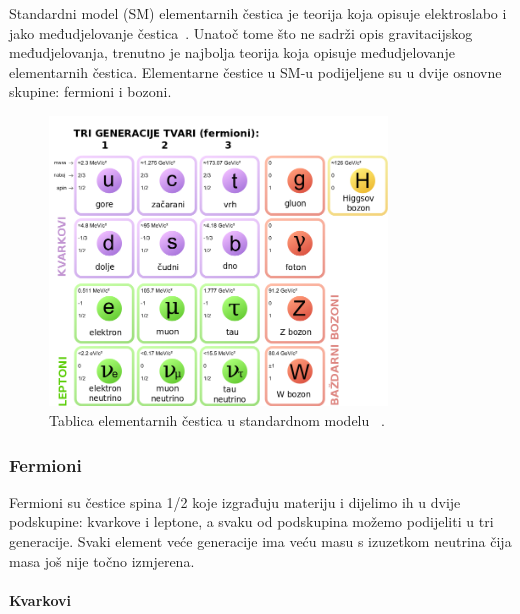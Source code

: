 \documentclass[12pt,a4paper,oneside]{article}
\begin{document}
\begin{linenumbers}
		Standardni model (SM) elementarnih čestica je teorija koja opisuje elektroslabo i jako međudjelovanje čestica~\cite{uvod}. Unatoč tome što ne sadrži opis gravitacijskog međudjelovanja, trenutno je najbolja teorija koja opisuje međudjelovanje elementarnih čestica.
		Elementarne čestice u SM-u podijeljene su u dvije osnovne skupine: fermioni i bozoni.
		\begin{figure}[H]
			\centering
			\includegraphics[width=0.8\textwidth]{Standard_Model_of_Elementary_Particles_hr.png}
			\caption[SM]{\label{sl:primjer}Tablica elementarnih čestica u standardnom modelu ~\cite{standardni_model}.}
		\end{figure}
		
		
		\subsubsection{Fermioni}
		Fermioni su čestice spina 1/2 koje izgrađuju materiju i dijelimo ih u dvije podskupine: kvarkove i leptone, a svaku od podskupina možemo podijeliti u tri generacije. Svaki element veće generacije ima veću masu s izuzetkom neutrina čija masa još nije točno izmjerena.
		\paragraph{Kvarkovi\newline}
		

\end{linenumbers}
\end{document}
